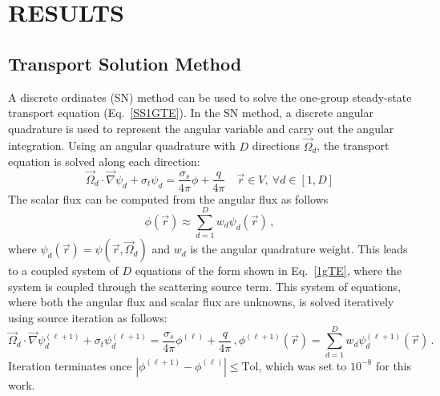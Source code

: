 \documentclass[12pt]{report}
\newcommand{\vr}{\vec{r}}
\newcommand{\vO}{\vec{\Omega}}
\newcommand{\grad}{\vec{\nabla}}
\newcommand{\sigt}{\sigma_t}
\newcommand{\sigs}{\sigma_s}
\newcommand{\angSource}{\frac{q}{4 \pi}}
\begin{document}
\chapter{\uppercase {Results}} \label{chap:results}

\section{Transport Solution Method}
A discrete ordinates (SN) method can be used to solve the one-group steady-state transport 
equation (Eq.~\eqref{SS1GTE}). In the SN method, a discrete angular quadrature is used to represent
the angular variable and carry out the angular integration.
Using an angular quadrature with $D$ directions $\vO_d$, the transport 
equation is solved along each direction:
\begin{equation}
\label{1gSNTE}
\vO_d \cdot \grad \psi_d + \sigt \psi_d = \frac{\sigs}{4 \pi} \phi + \angSource \quad \vr \in V ,\  \forall d\in [1,D]
\end{equation}
%
The scalar flux can be computed from the angular flux as follows
\[
\phi(\vr) \approx \sum_{d=1}^D w_d \psi_d(\vr) \,,
\] 
where $\psi_d(\vr) = \psi(\vr, \vO_d)$ and $w_d$ is the angular quadrature weight. This leads to a coupled system of $D$ equations of the form shown in Eq.~\eqref{1gTE}, where the system is coupled through the scattering source term. This system of equations, where both 
the angular flux and scalar flux are unknowns, is solved iteratively using source iteration as follows:
\begin{subequations}
\begin{equation}
\label{1gTE}
\vO_d \cdot \grad \psi_d^{(\ell+1)} + \sigt \psi_d^{(\ell+1)} = \frac{\sigs}{4 \pi} \phi^{(\ell)} + \angSource \,,
\end{equation}
\begin{equation}
\phi^{(\ell+1)}(\vr) = \sum_{d=1}^D w_d \psi_d^{(\ell+1)}(\vr) \,.
\end{equation}
\end{subequations}
Iteration terminates once $\left|\phi^{(\ell+1)} - \phi^{(\ell)} \right| \leq \text{Tol}$, which was set to $10^{-8}$ for this work.
\end{document}
